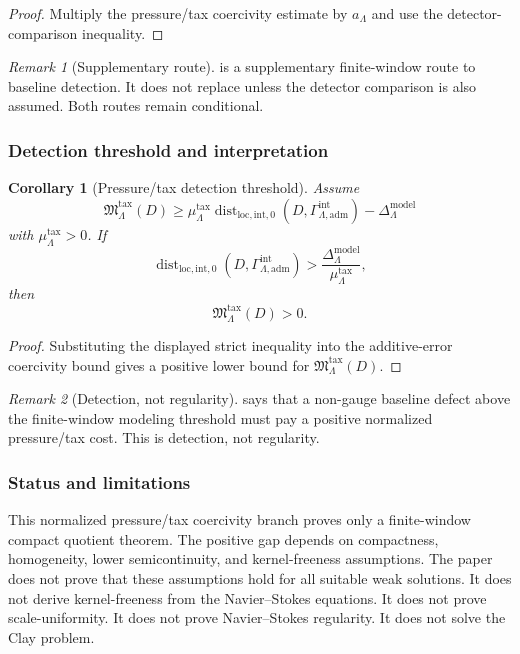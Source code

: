 \documentclass[11pt]{article}
\numberwithin{equation}{section}
\newtheorem{corollary}[corollary]{Corollary}
\theoremstyle{definition}
\theoremstyle{remark}
\newtheorem{remark}[remark]{Remark}
\newcommand{\loc}{\mathrm{loc}}
\newcommand{\intg}{\mathrm{int}}
\newcommand{\adm}{\mathrm{adm}}
\newcommand{\Dist}{\operatorname{dist}}
\newcommand{\Gammaadm}{\Gamma^{\intg}_{\Lambda,\adm}}
\begin{document}
\begin{proof}
Multiply the pressure/tax coercivity estimate by \(a_\Lambda\) and use the
detector-comparison inequality.
\end{proof}

\begin{remark}[Supplementary route]
 is a supplementary finite-window
route to baseline detection.  It does not replace
 unless the detector comparison is
also assumed.  Both routes remain conditional.
\end{remark}

\subsubsection{Detection threshold and interpretation}

\begin{corollary}[Pressure/tax detection threshold]
\label{cor:pressure-tax-detection-threshold}
Assume
\[
    \mathfrak M^{\mathrm{tax}}_\Lambda(D)
    \ge
    \mu^{\mathrm{tax}}_\Lambda
    \Dist_{\loc,\intg,0}(D,\Gammaadm)
    -
    \Delta^{\mathrm{model}}_\Lambda
\]
with \(\mu^{\mathrm{tax}}_\Lambda>0\).  If
\[
    \Dist_{\loc,\intg,0}(D,\Gammaadm)
    >
    \frac{\Delta^{\mathrm{model}}_\Lambda}{\mu^{\mathrm{tax}}_\Lambda},
\]
then
\[
    \mathfrak M^{\mathrm{tax}}_\Lambda(D)>0.
\]
\end{corollary}

\begin{proof}
Substituting the displayed strict inequality into the additive-error
coercivity bound gives a positive lower bound for
\(\mathfrak M^{\mathrm{tax}}_\Lambda(D)\).
\end{proof}

\begin{remark}[Detection, not regularity]
 says that a non-gauge baseline
defect above the finite-window modeling threshold must pay a positive
normalized pressure/tax cost.  This is detection, not regularity.
\end{remark}

\subsubsection{Status and limitations}

This normalized pressure/tax coercivity branch proves only a finite-window
compact quotient theorem.  The positive gap depends on compactness,
homogeneity, lower semicontinuity, and kernel-freeness assumptions.  The
paper does not prove that these assumptions hold for all suitable weak
solutions.  It does not derive kernel-freeness from the Navier--Stokes
equations.  It does not prove scale-uniformity.  It does not prove
Navier--Stokes regularity.  It does not solve the Clay problem.
\end{document}
